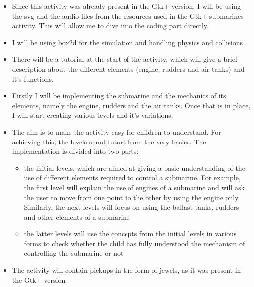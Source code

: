 \documentclass[preprint,12pt]{elsarticle}
\begin{document}
\begin{itemize}

\item Since this activity was already present in the Gtk+ version, I will be using the svg and the audio files from the resources used in the Gtk+ submarines activity. This will allow me to dive into the coding part directly. 

\item I will be using box2d for the simulation and handling physics and collisions

\item There will be a tutorial at the start of the activity, which will give a brief description about the different elements (engine, rudders and air tanks) and it's functions.

\item Firstly I will be implementing the submarine and the mechanics of its elements, namely the engine, rudders and the air tanks. Once that is in place, I will start creating various levels and it's variations.


\item The aim is to make the activity easy for children to understand. For achieving this, the levels should start from the very basics. The implementation is divided into two parts: 

\begin{itemize}
\item the initial levels, which are aimed at giving a basic understanding of the use of different elements required to control a submarine. For example, the first level will explain the use of engines of a submarine and will ask the user to move from one point to the other by using the engine only. Similarly, the next levels will focus on using the ballast tanks, rudders and other elements of a submarine
\item the latter levels will use the concepts from the initial levels in various forms to check whether the child has fully understood the mechanism of controlling the submarine or not
\end{itemize}
\item The activity will contain pickups in the form of jewels, as it was present in the Gtk+ version


\end{itemize}
\end{document}
